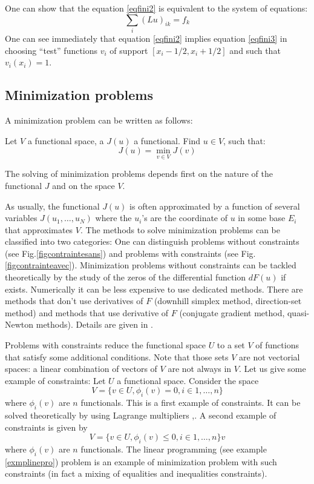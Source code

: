\documentclass[12pt]{book}
\begin{document}
One can show that the equation \ref{eqfini2} is equivalent to the system of
equations:
\begin{equation}\label{eqfini3}
\sum_i (Lu)_{ik} =f_k
\end{equation}
One can see immediately that equation \ref{eqfini2} implies equation
\ref{eqfini3} in choosing ``test'' functions $v_i$ of support
$[x_i-1/2,x_i+1/2]$ and such that $v_i(x_i)=1$.


\subsection{Minimization problems}
A minimization problem can be written as follows:
\begin{prob}\label{promini}
Let $V$ a functional space, a $J(u)$ a functional.
Find $u\in V$, such that:
\begin{equation}
J(u)=\min_{v\in V} J(v)
\end{equation}
\end{prob}
The solving of minimization problems depends first on the nature of the
functional $J$ and on the space $V$.

As usually, the functional $J(u)$ is often approximated by a function of
several variables $J(u_1,\dots,u_N)$ where the $u_i$'s are the coordinate of
$u$ in some base $E_i$ that approximates $V$.
The methods to solve minimization problems can be classified into two
categories: 
One can distinguish problems without constraints (see
Fig.\ref{figcontraintesans}) and problems with constraints (see
Fig.\ref{figcontrainteavec}).
Minimization problems without constraints can be tackled theoretically by the
study of the zeros of the differential function $dF(u)$ if
exists. Numerically it can be less expensive to use dedicated methods. There
are methods that don't use derivatives of $F$ (downhill simplex method,
direction-set method) and methods that use derivative of $F$ (conjugate
gradient method, quasi-Newton methods). Details are given in 
\cite{ma:compu:Press92}.

Problems with constraints reduce the functional space $U$ to a set $V$ of
functions that satisfy some additional conditions.
Note that those sets $V$ are not vectorial spaces: a linear
combination of vectors of $V$ are not always in $V$. Let us give some example
of  constraints:
Let $U$ a functional space.
Consider the space
\begin{equation}
V=\{v\in U, \phi_{i}(v)=0, i\in 1,\dots,n \}
\end{equation}
where $\phi_{i}(v)$ are $n$ functionals. This is a first example of
constraints. It can be solved theoretically by using Lagrange
multipliers \cite{ma:equad:Ciarlet88},. 
A second example of constraints is given by
\begin{equation}
V=\{v\in U, \phi_{i}(v)\leq 0, i\in 1,\dots,n  \}
v\end{equation}
where $\phi_{i}(v)$ are $n$ functionals.
The linear programming (see example \ref{exmplinepro}) problem is an example
of minimization problem with such constraints (in fact a mixing of equalities
and inequalities constraints).
\end{document}
